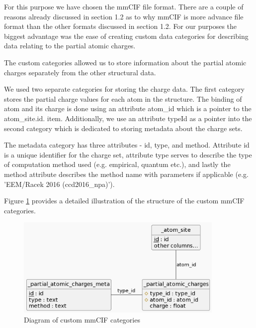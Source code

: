 \documentclass[
  digital,     %
  oneside,     %
  nosansbold,  %
  nocolorbold, %
  lof,         %
  lot,         %
]{fithesis4}
\begin{document}
For this purpose we have chosen the mmCIF file format. There are a couple of reasons already discussed in section 1.2 as to why mmCIF is more advance file format than the other formats discussed in section 1.2. For our purposes the biggest advantage was the ease of creating custom data categories for describing data relating to the partial atomic charges.

The custom categories allowed us to store information about the partial atomic charges separately from the other structural data.

We used two separate categories for storing the charge data.
The first category stores the partial charge values for each atom in the structure. The binding of atom and its charge is done using an attribute atom\_id which is a pointer to the atom\_site.id. item. Additionally, we use an attribute typeId as a pointer into the second category which is dedicated to storing metadata about the charge sets.

The metadata category has three attributes - id, type, and method. Attribute id is a unique identifier for the charge set, attribute type serves to describe the type of computation method used (e.g. empirical, quantum etc.), and lastly the method attribute describes the method name with parameters if applicable (e.g. 'EEM/Racek 2016 (ccd2016\_npa)').

Figure \ref{fig:mmcif_erd} provides a detailed illustration of the structure of the custom mmCIF categories.

\begin{figure}
  \begin{center}
    \includegraphics[width=10cm]{figures/mmcif_erd.png}
  \end{center}
  \caption{Diagram of custom mmCIF categories}
  \label{fig:mmcif_erd}
\end{figure}
\end{document}
